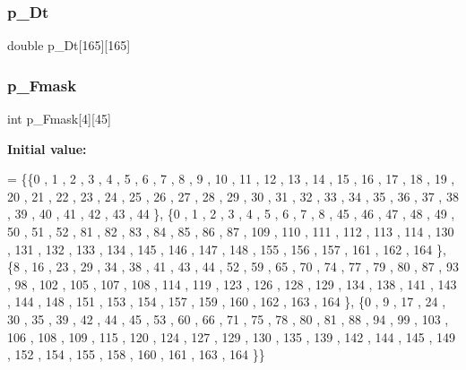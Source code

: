 \mbox{\label{a00500_aaa90077cb54e459dde9dca92d34a8a43}} 
\subsubsection{\texorpdfstring{p\+\_\+\+Dt}{p\_Dt}}
{\footnotesize\ttfamily double p\+\_\+\+Dt\mbox{[}165\mbox{]}\mbox{[}165\mbox{]}}

\mbox{\label{a00500_a4faa1bd3e7f74b8102339c1e404cdc59}} 
\subsubsection{\texorpdfstring{p\+\_\+\+Fmask}{p\_Fmask}}
{\footnotesize\ttfamily int p\+\_\+\+Fmask\mbox{[}4\mbox{]}\mbox{[}45\mbox{]}}

{\bfseries Initial value\+:}
\begin{DoxyCode}
= \{\{0 , 1 , 2 , 3 , 4 , 5 , 6 , 7 , 8 , 9 , 10 , 11 , 12 , 13 , 14 , 15 , 16 , 17 , 18 , 19 , 20 , 21 , 22 
      , 23 , 24 , 25 , 26 , 27 , 28 , 29 , 30 , 31 , 32 , 33 , 34 , 35 , 36 , 37 , 38 , 39 , 40 , 41 , 42 , 43 , 
      44 \},
\{0 , 1 , 2 , 3 , 4 , 5 , 6 , 7 , 8 , 45 , 46 , 47 , 48 , 49 , 50 , 51 , 52 , 81 , 82 , 83 , 84 , 85 , 86 , 
      87 , 109 , 110 , 111 , 112 , 113 , 114 , 130 , 131 , 132 , 133 , 134 , 145 , 146 , 147 , 148 , 155 , 156 , 
      157 , 161 , 162 , 164 \},
\{8 , 16 , 23 , 29 , 34 , 38 , 41 , 43 , 44 , 52 , 59 , 65 , 70 , 74 , 77 , 79 , 80 , 87 , 93 , 98 , 102 , 
      105 , 107 , 108 , 114 , 119 , 123 , 126 , 128 , 129 , 134 , 138 , 141 , 143 , 144 , 148 , 151 , 153 , 154 , 
      157 , 159 , 160 , 162 , 163 , 164 \},
\{0 , 9 , 17 , 24 , 30 , 35 , 39 , 42 , 44 , 45 , 53 , 60 , 66 , 71 , 75 , 78 , 80 , 81 , 88 , 94 , 99 , 103
       , 106 , 108 , 109 , 115 , 120 , 124 , 127 , 129 , 130 , 135 , 139 , 142 , 144 , 145 , 149 , 152 , 154 , 155
       , 158 , 160 , 161 , 163 , 164 \}\}
\end{DoxyCode}
\mbox{\label{a00500_ab1c3d42172c62e2f352ea043fe1b80b5}} 
